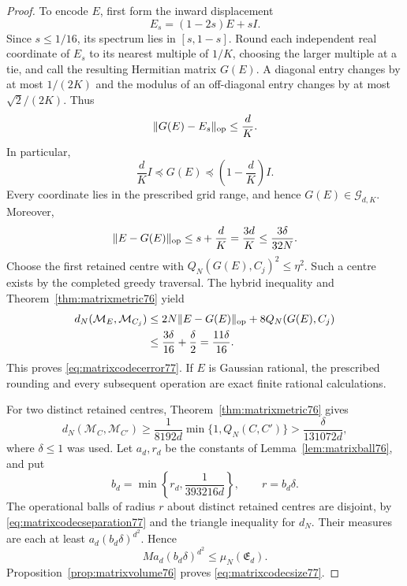 \begin{proof}
To encode $E$, first form the inward displacement
\[
 E_s=(1-2s)E+sI.
\]
Since $s\le1/16$, its spectrum lies in $[s,1-s]$.
Round each independent real coordinate of $E_s$ to its nearest
multiple of $1/K$, choosing the larger multiple at a tie, and call
the resulting Hermitian matrix $G(E)$.  A diagonal entry changes by
at most $1/(2K)$ and the modulus of an off-diagonal entry changes by
at most $\sqrt2/(2K)$.  Thus
\[
 \|G(E)-E_s\|_{\rm op}\le\frac dK.
\]
In particular,
\begin{equation}\label{eq:matrixcodecgridlegal77}
 \frac dK I\preceq G(E)\preceq\left(1-\frac dK\right)I.
\end{equation}
Every coordinate lies in the prescribed grid range, and hence
$G(E)\in\mathcal G_{d,K}$.  Moreover,
\begin{equation}\label{eq:matrixcodecround77}
 \|E-G(E)\|_{\rm op}
 \le s+\frac dK=\frac{3d}{K}
 \le\frac{3\delta}{32N}.
\end{equation}
Choose the first retained centre with
$Q_N(G(E),C_j)^2\le\eta^2$.  Such a centre exists by the completed
greedy traversal.  The hybrid inequality and
Theorem~\ref{thm:matrixmetric76} yield
\[
 \begin{split}
 d_N(\mathcal M_E,\mathcal M_{C_j})
 &\le 2N\|E-G(E)\|_{\rm op}+8Q_N(G(E),C_j)\\
 &\le\frac{3\delta}{16}+\frac\delta2
 =\frac{11\delta}{16}.
 \end{split}
\]
This proves \eqref{eq:matrixcodecerror77}.  If $E$ is Gaussian
rational, the prescribed rounding and every subsequent operation
are exact finite rational calculations.

For two distinct retained centres,
Theorem~\ref{thm:matrixmetric76} gives
\begin{equation}\label{eq:matrixcodecseparation77}
 d_N(\mathcal M_C,\mathcal M_{C'})
 \ge\frac1{8192d}\min\{1,Q_N(C,C')\}
 >\frac{\delta}{131072d},
\end{equation}
where $\delta\le1$ was used.  Let $a_d,r_d$ be the constants of
Lemma~\ref{lem:matrixball76}, and put
\[
 b_d=\min\left\{r_d,\frac1{393216d}\right\},\qquad r=b_d\delta.
\]
The operational balls of radius $r$ about distinct retained centres
are disjoint, by \eqref{eq:matrixcodecseparation77} and the triangle
inequality for $d_N$.  Their measures are each at least
$a_d(b_d\delta)^{d^2}$.  Hence
\[
 M a_d(b_d\delta)^{d^2}\le\mu_N(\mathfrak E_d).
\]
Proposition~\ref{prop:matrixvolume76} proves
\eqref{eq:matrixcodecsize77}.


\end{proof}
